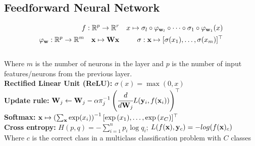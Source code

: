 %
\begin{mdframed}[style=eqbox]
\subsection{Feedforward Neural Network}
\vspace*{-6pt}\begin{align*}
  f: \mathbb{R}^p \to \mathbb R^r && x \mapsto \sigma_l \circ \varphi_{\mathbf{w}_l} \circ \cdots \circ \sigma_1 \circ \varphi_{\mathbf{w}_1}(x)\\
  \varphi_{\mathbf{w}}: \mathbb R^p \to \mathbb R^m \quad \mathbf{x} \mapsto \mathbf{W} \mathbf{x} && \sigma: \mathbf{x} \mapsto [\sigma(x_1), \ldots, \sigma(x_m)]^\top
\end{align*}\vspace*{-14pt}\\
\small{Where $m$ is the number of neurons in the layer and $p$ is the number of input features/neurons from the previous layer.}\\
\textbf{Rectified Linear Unit (ReLU):} $\sigma(x) = \max(0, x)$\\
\textbf{Update rule:} $\mathbf{W}_{j} \gets \mathbf{W}_{j} - \alpha \pi_j^{-1}\left( \cfrac{d}{d \mathbf{W}_j} L(\mathbf{y}_i, f(\mathbf{x}_i))\right)^\top$\\
\textbf{Softmax:} $\mathbf{x} \mapsto \left(\sum_{\mathbf{x}} \exp(x_i)\right)^{-1} [\exp{(x_1)}, \ldots, \exp{(x_C)}]^\top$\\
\textbf{Cross entropy:} $H(p,q) = -\sum_{i=1}^{n} p_i \log q_i$; $L(f(\mathbf{x}), \mathbf{y}_c) = - log(f(\mathbf{x})_c)$\\[0.25em]
\small{Where $c$ is the correct class in a multiclass classification problem with $C$ classes}
\end{mdframed}
%

